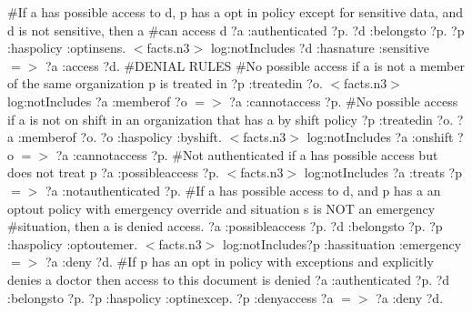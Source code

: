 \documentclass[conference]{IEEEtran}
\begin{document}
\newline
\#If a has possible access to d, p has a opt in policy except for sensitive data, and d is not sensitive, then a \newline
\#can access d \newline
\newline
{?a :authenticated ?p. ?d :belongsto ?p. ?p :haspolicy :optinsens. $<$facts.n3$>$ log:notIncludes {?d :hasnature :sensitive}}  $=>$ {?a :access ?d}. \newline
\newline
\#DENIAL RULES
\newline
\#No possible access if a is not a member of the same organization p is treated in \newline
\newline
{?p :treatedin ?o. $<$facts.n3$>$ log:notIncludes {?a :memberof ?o}}  $=>$ {?a :cannotaccess ?p}.
\newline
\#No possible access if a is not on shift in an organization that has a by shift policy \newline
\newline
{?p :treatedin ?o. ?a :memberof ?o. ?o :haspolicy :byshift. $<$facts.n3$>$ log:notIncludes {?a :onshift ?o}}  $=>$ {?a :cannotaccess ?p}.
\newline
\#Not authenticated if a has possible access but does not treat p \newline
\newline
{?a :possibleaccess ?p. $<$facts.n3$>$ log:notIncludes {?a :treats ?p}}  $=>$ {?a :notauthenticated ?p}.
\newline
\#If a has possible access to d, and p has a an optout policy with emergency override and situation s is NOT an emergency \newline
\#situation, then a is denied access.\newline
\newline
{?a :possibleaccess ?p. ?d :belongsto ?p. ?p :haspolicy :optoutemer. $<$facts.n3$>$ log:notIncludes{?p :hassituation :emergency}}  $=>$ {?a :deny ?d}. \newline
\newline
\#If p has an opt in policy with exceptions and explicitly denies a doctor then access to this document is denied \newline
\newline
{?a :authenticated ?p. ?d :belongsto ?p. ?p :haspolicy :optinexcep. ?p :denyaccess ?a}  $=>$ {?a :deny ?d}. \newline
\newline
\end{document}
